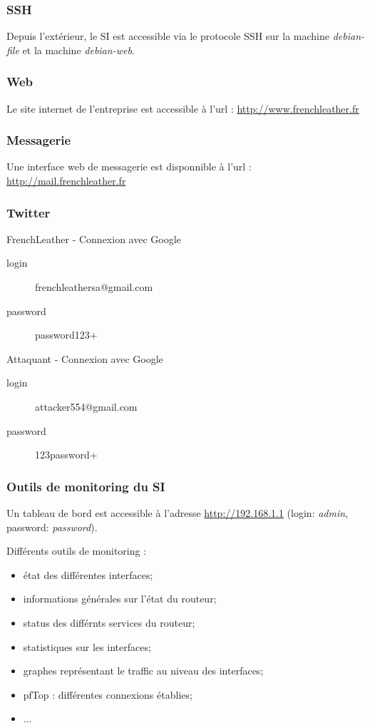 \documentclass{beamer}
\begin{document}
		\begin{frame}
			\frametitle{SSH}
			Depuis l'extérieur, le SI est accessible via le protocole SSH sur la machine \textit{debian-file} et la machine \textit{debian-web}.
		\end{frame}
		\begin{frame}
			\frametitle{Web}
			Le site internet de l'entreprise est accessible à l'url : \url{http://www.frenchleather.fr}
		\end{frame}
		\begin{frame}
			\frametitle{Messagerie}
			Une interface web de messagerie est disponnible à l'url : \url{http://mail.frenchleather.fr}
		\end{frame}
		\begin{frame}
			\frametitle{Twitter}
			\begin{alertblock}{FrenchLeather - Connexion avec Google}
				\begin{description}
					\item[login] frenchleathersa@gmail.com
					\item[password] password123+
				\end{description}
			\end{alertblock}
			\begin{alertblock}{Attaquant - Connexion avec Google}
				\begin{description}
					\item[login] attacker554@gmail.com
					\item[password] 123password+
				\end{description}
			\end{alertblock}
		\end{frame}
		\begin{frame}
			\frametitle{Outils de monitoring du SI}
			Un tableau de bord est accessible à l'adresse \url{http://192.168.1.1} (login: \textit{admin}, password: \textit{password}).

			Différents outils de monitoring :
			\begin{itemize}
				\item état des différentes interfaces;
				\item informations générales sur l'état du routeur;
				\item status des différnts services du routeur;
				\item statistiques sur les interfaces;
				\item graphes représentant le traffic au niveau des interfaces;
				\item pfTop : différentes connexions établies;
				\item ...
			\end{itemize}
		\end{frame}
\end{document}
